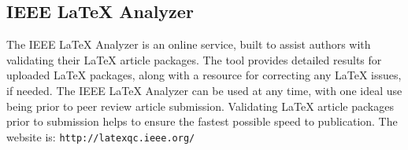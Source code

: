 \subsection{IEEE LaTeX Analyzer}
The IEEE LaTeX Analyzer is an online service, built to assist authors with validating their LaTeX article packages. The tool provides detailed results for uploaded LaTeX packages, along with a resource for correcting any LaTeX issues, if needed. The IEEE LaTeX Analyzer can be used at any time, with one ideal use being prior to peer review article submission. Validating LaTeX article packages prior to submission helps to ensure the fastest possible speed to publication.
The website is:
\verb+http://latexqc.ieee.org/+